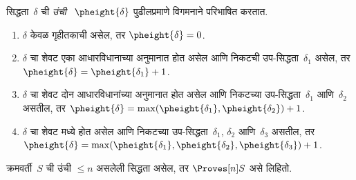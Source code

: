 \begin{defn}
सिद्धता~$\delta$ ची
\emph{उंची}~
$\pheight{\delta}$
पुढीलप्रमाणे विगमनाने
परिभाषित करतात.
\begin{enumerate}
  \item $\delta$ केवळ
  गृहीतकाची असेल, तर
  $\pheight{\delta} = 0$.
  \item $\delta$ चा शेवट
  एका आधारविधानाच्या
  अनुमानात होत असेल
  आणि निकटची
  उप-सिद्धता~$\delta_1$
  असेल, तर
  $\pheight{\delta} =
  \pheight{\delta_1} + 1$.
  \item $\delta$ चा शेवट
  दोन आधारविधानांच्या
  अनुमानात होत असेल
  आणि निकटच्या
  उप-सिद्धता~$\delta_1$
  आणि~$\delta_2$ असतील,
  तर $\pheight{\delta} =
  \max(\pheight{\delta_1},
  \pheight{\delta_2}) + 1$.
  \item $\delta$ चा शेवट
  \Elim{\lor} मध्ये होत
  असेल आणि निकटच्या
  उप-सिद्धता~$\delta_1$,
  $\delta_2$ आणि~$\delta_3$
  असतील, तर
  $\pheight{\delta} =
  \max(\pheight{\delta_1},
  \pheight{\delta_2},
  \pheight{\delta_3}) + 1$.
\end{enumerate}
क्रमवर्ती~$S$ ची उंची
$\le n$ असलेली
सिद्धता असेल,
तर $ \Proves[n] S$
असे लिहितो.
\end{defn}

